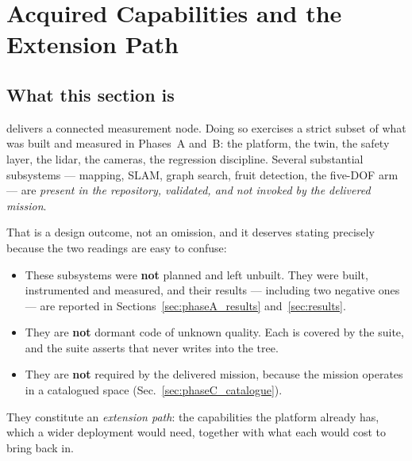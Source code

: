 \section{Acquired Capabilities and the Extension Path}
\label{sec:extension}

\subsection{What this section is}

\phaseC{} delivers a connected measurement node. Doing so exercises a
strict subset of what was built and measured in Phases~A and~B: the
platform, the twin, the safety layer, the lidar, the cameras, the
regression discipline. Several substantial subsystems --- mapping, SLAM,
graph search, fruit detection, the five-DOF arm --- are \emph{present in
the repository, validated, and not invoked by the delivered mission}.

That is a design outcome, not an omission, and it deserves stating
precisely because the two readings are easy to confuse:

\begin{itemize}[leftmargin=*,itemsep=1pt,topsep=2pt]
  \item These subsystems were \textbf{not} planned and left unbuilt.
        They were built, instrumented and measured, and their results
        --- including two negative ones --- are reported in
        Sections~\ref{sec:phaseA_results} and~\ref{sec:results}.
  \item They are \textbf{not} dormant code of unknown quality. Each is
        covered by the \phaseB{} suite, and the \phaseC{} suite asserts
        that \phaseC{} never writes into the \phaseB{} tree.
  \item They are \textbf{not} required by the delivered mission, because
        the mission operates in a catalogued space
        (Sec.~\ref{sec:phaseC_catalogue}).
\end{itemize}

They constitute an \emph{extension path}: the capabilities the platform
already has, which a wider deployment would need, together with what
each would cost to bring back in.

